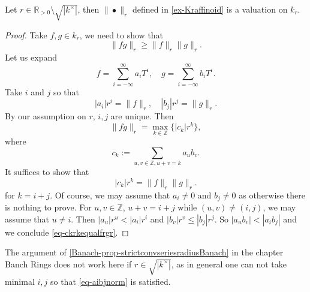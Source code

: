 \begin{proposition}
    Let $r\in \mathbb{R}_{>0}\setminus \sqrt{|k^{\times}|}$, then $\|\bullet\|_r$ defined in \cref{ex-Kraffinoid} is a valuation on $k_r$.
\end{proposition}
\begin{proof}
    Take $f,g\in k_r$, we need to show that
    \[
      \|fg\|_r\geq \|f\|_r\|g\|_r.  
    \]
    Let us expand
    \[
      f=\sum_{i=-\infty}^{\infty} a_i T^i,\quad   g=\sum_{i=-\infty}^{\infty} b_i T^i.
    \]
    Take $i$ and $j$ so that
    \begin{equation}\label{eq-aibjnorm}
      |a_i|r^i=\|f\|_r,\quad |b_j|r^j=\|g\|_r.  
    \end{equation}
    By our assumption on $r$, $i,j$ are unique.
    Then
    \[
      \|fg\|_r=\max_{k\in \mathbb{Z}}\{ |c_k|r^k\},
    \]
    where 
    \[
      c_k:=\sum_{u,v\in \mathbb{Z},u+v=k}a_ub_v.  
    \]
    It suffices to show that
    \begin{equation}\label{eq-ckrkequalfrgr}
        |c_k|r^k=\|f\|_r\|g\|_r.
    \end{equation}
    for $k=i+j$. Of course, we may assume that $a_i\neq 0$ and $b_j\neq 0$ as otherwise there is nothing to prove.
    For $u,v\in \mathbb{Z}$, $u+v=i+j$ while $(u,v)\neq (i,j)$, we may assume that $u\neq i$. Then $|a_u|r^u < |a_i|r^i$ and $|b_v|r^v\leq |b_j|r^j$. So $|a_ub_v|< |a_ib_j|$ and we conclude \eqref{eq-ckrkequalfrgr}.
\end{proof}
\begin{remark}
    The argument of \cref{Banach-prop-strictconvseriesradiusBanach} in the chapter Banch Rings does not work here if $r\in \sqrt{|k^{\times}|}$, as in general one can not take minimal $i,j$ so that \eqref{eq-aibjnorm} is satisfied.
\end{remark}



